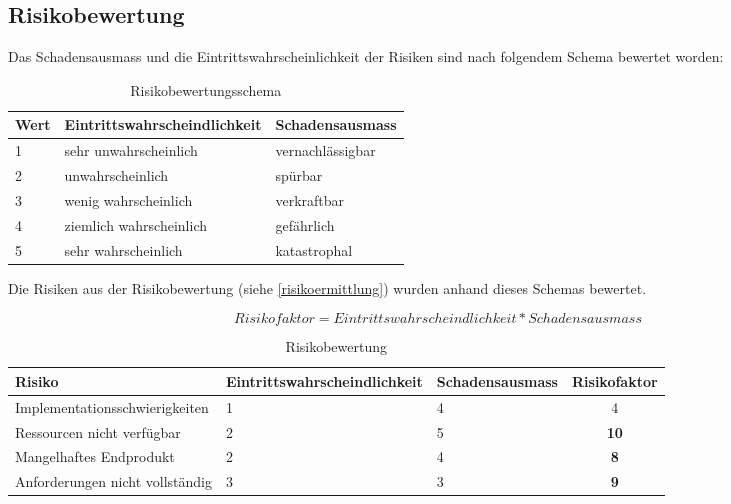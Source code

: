 \subsection{Risikobewertung}
Das Schadensausmass und die Eintrittswahrscheinlichkeit der Risiken sind nach folgendem Schema bewertet worden:

\begin{table}[ht]
\centering
  \begin{tabular}{ l | p{5cm} | p{5cm} }
	\hline
	\rowcolor{gray}
	Wert							&	Eintrittswahrscheindlichkeit	&	Schadensausmass	\\ \hline			
	1							&	sehr unwahrscheinlich		&	vernachlässigbar	\\ \hline
	2							&	unwahrscheinlich			&	spürbar		\\ \hline
	3							&	wenig wahrscheinlich		&	verkraftbar		\\ \hline
	4							&	ziemlich wahrscheinlich		&	gefährlich		\\ \hline
	5							&	sehr wahrscheinlich			&	katastrophal		\\ \hline
  \end{tabular}
   \caption{Risikobewertungsschema}
\end{table}

\FloatBarrier
Die Risiken aus der Risikobewertung (siehe \ref{risikoermittlung}) wurden anhand dieses Schemas bewertet.

\begin{equation*}
Risikofaktor = Eintrittswahrscheindlichkeit * Schadensausmass
\end{equation*}

\begin{table}[ht]
\centering
  \begin{tabular}{ l | p{4cm} | p{3cm} | c }
	\hline
	\rowcolor{gray}
	Risiko							&	Eintrittswahrscheindlichkeit	&	Schadensausmass 	&	Risikofaktor\\ \hline			
	Implementationsschwierigkeiten			&	1					&	4			&	4		\\ \hline
	Ressourcen nicht verfügbar			&	2					&	5			&	\textbf{10}	\\ \hline
	Mangelhaftes Endprodukt				&	2					&	4			&	\textbf{8}	\\ \hline
	Anforderungen nicht vollständig			&	3					&	3			&	\textbf{9}	\\ \hline
  \end{tabular}
   \caption{Risikobewertung}
\end{table}

